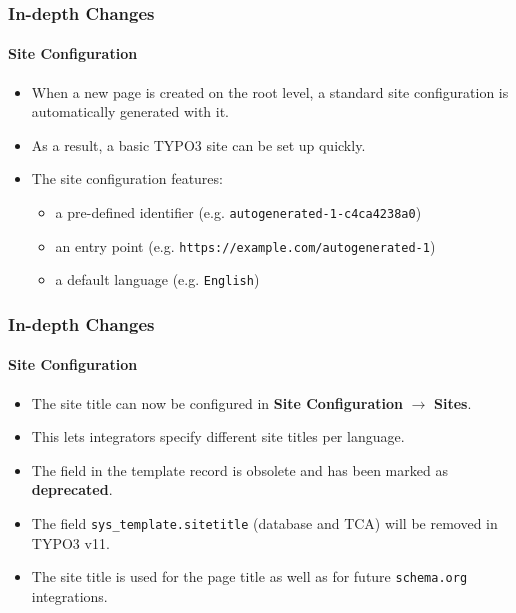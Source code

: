 
\begin{frame}[fragile]
	\frametitle{In-depth Changes}
	\framesubtitle{Site Configuration}

	\begin{itemize}
		\item When a new page is created on the root level, a standard site
			configuration is automatically generated with it.
		\item As a result, a basic TYPO3 site can be set up quickly.
		\item The site configuration features:

			\begin{itemize}
				\item a pre-defined identifier (e.g. \texttt{autogenerated-1-c4ca4238a0})
				\item an entry point (e.g. \texttt{https://example.com/autogenerated-1})
				\item a default language (e.g. \texttt{English})
			\end{itemize}

	\end{itemize}

\end{frame}


\begin{frame}[fragile]
	\frametitle{In-depth Changes}
	\framesubtitle{Site Configuration}

	\begin{itemize}

		\item The site title can now be configured in
			\textbf{Site Configuration} $\rightarrow$ \textbf{Sites}.
		\item This lets integrators specify different site titles per language.
		\item The field in the template record is obsolete and has been marked as \textbf{deprecated}.
		\item The field \texttt{sys\_template.sitetitle} (database and TCA) will be removed in TYPO3 v11.
		\item The site title is used for the page title as well as for
			future \texttt{schema.org} integrations.
	\end{itemize}

\end{frame}

